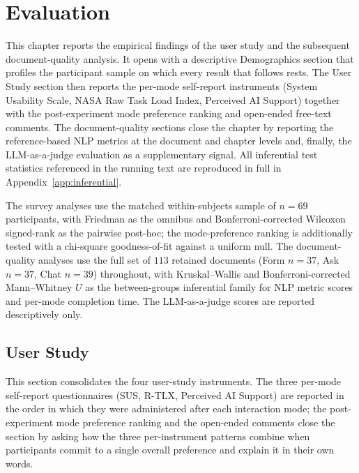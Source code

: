 \chapter{Evaluation }
\label{ch:evaluation}

This chapter reports the empirical findings of the user study and
the subsequent document-quality analysis. It opens with a
descriptive Demographics section that profiles the participant
sample on which every result that follows rests. The User Study
section then reports the per-mode self-report instruments (System
Usability Scale, NASA Raw Task Load Index, Perceived AI Support)
together with the post-experiment mode preference ranking and
open-ended free-text comments. The document-quality sections close
the chapter by reporting the reference-based NLP metrics at the
document and chapter levels and, finally, the LLM-as-a-judge
evaluation as a supplementary signal.
All inferential test statistics referenced in
the running text are reproduced in full in
Appendix~\ref{app:inferential}.

The survey analyses use the matched within-subjects sample of
$n = 69$ participants, with Friedman as the omnibus and
Bonferroni-corrected Wilcoxon signed-rank as the pairwise
post-hoc; the mode-preference ranking is additionally tested with a
chi-square goodness-of-fit against a uniform null. The
document-quality analyses use the full set of $113$ retained
documents (Form $n = 37$, Ask $n = 37$, Chat $n = 39$) throughout,
with Kruskal--Wallis and Bonferroni-corrected Mann--Whitney $U$ as
the between-groups inferential family for NLP metric scores and
per-mode completion time. The LLM-as-a-judge scores are reported
descriptively only.



\section{User Study}
\label{sec:eval-userstudy}

This section consolidates the four user-study instruments. The
three per-mode self-report questionnaires (SUS, R-TLX, Perceived AI
Support) are reported in the order in which they were administered
after each interaction mode; the post-experiment mode preference
ranking and the open-ended comments close the section by asking how
the three per-instrument patterns combine when participants commit
to a single overall preference and explain it in their own words.










